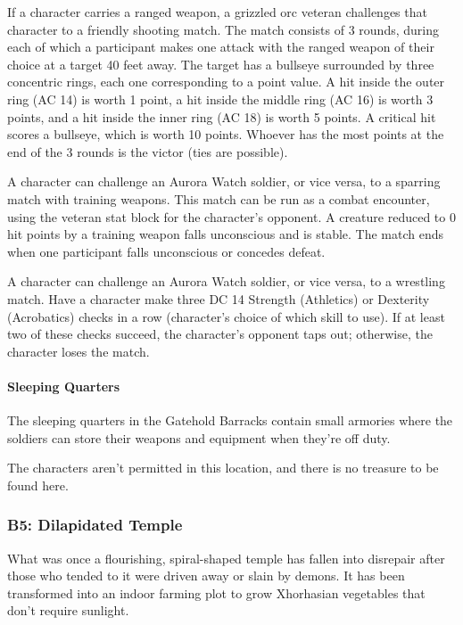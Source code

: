 \documentclass[10pt,a4paper,twoside,twocolumn,openany,nodeprecatedcode]{dndbook}
\begin{document}
\begin{description}[nolistsep]
\item[Shooting Match.]
If a character carries a ranged weapon, a grizzled orc veteran challenges that character to a friendly shooting match. The match consists of 3 rounds, during each of which a participant makes one attack with the ranged weapon of their choice at a target 40 feet away. The target has a bullseye surrounded by three concentric rings, each one corresponding to a point value. A hit inside the outer ring (AC 14) is worth 1 point, a hit inside the middle ring (AC 16) is worth 3 points, and a hit inside the inner ring (AC 18) is worth 5 points. A critical hit scores a bullseye, which is worth 10 points. Whoever has the most points at the end of the 3 rounds is the victor (ties are possible).
\item[Sparring Match.]
A character can challenge an Aurora Watch soldier, or vice versa, to a sparring match with training weapons. This match can be run as a combat encounter, using the veteran stat block for the character's opponent. A creature reduced to 0 hit points by a training weapon falls unconscious and is stable. The match ends when one participant falls unconscious or concedes defeat.
\item[Wrestling Match.]
A character can challenge an Aurora Watch soldier, or vice versa, to a wrestling match. Have a character make three DC 14 Strength (Athletics) or Dexterity (Acrobatics) checks in a row (character's choice of which skill to use). If at least two of these checks succeed, the character's opponent taps out; otherwise, the character loses the match.
\end{description}

\paragraph{Sleeping Quarters}
The sleeping quarters in the Gatehold Barracks contain small armories where the soldiers can store their weapons and equipment when they're off duty.

The characters aren't permitted in this location, and there is no treasure to be found here.

\subsubsection{B5: Dilapidated Temple}
What was once a flourishing, spiral-shaped temple has fallen into disrepair after those who tended to it were driven away or slain by demons. It has been transformed into an indoor farming plot to grow Xhorhasian vegetables that don't require sunlight.
\end{document}
